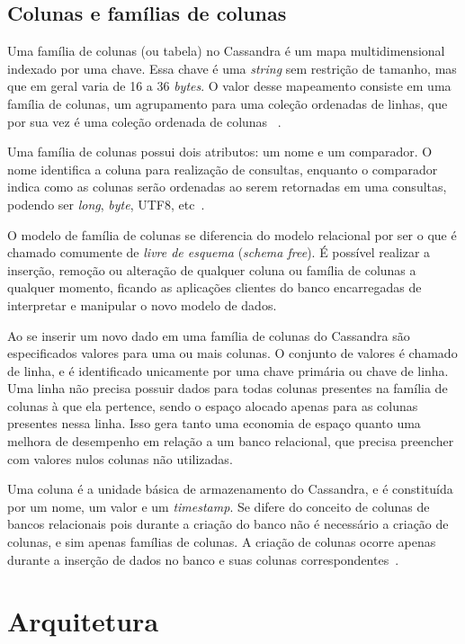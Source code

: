 \subsection*{Colunas e famílias de colunas}
Uma família de colunas (ou tabela) no Cassandra é um mapa multidimensional indexado por uma chave. Essa chave é uma \emph{string} sem restrição de tamanho, mas que em geral varia de 16 a 36 \emph{bytes}. O valor desse mapeamento consiste em uma família de colunas, um agrupamento para uma coleção ordenadas de linhas, que por sua vez é uma coleção ordenada de colunas ~\cite{lakshmancassandra, cassandraguide}.

Uma família de colunas possui dois atributos: um nome e um comparador. O nome identifica a coluna para realização de consultas, enquanto o comparador indica como as colunas serão ordenadas ao serem retornadas em uma consultas, podendo ser \emph{long}, \emph{byte}, UTF8, etc~\cite{cassandraguide}.

O modelo de família de colunas se diferencia do modelo relacional por ser o que é chamado comumente de \emph{livre de esquema} (\emph{schema free}). É possível realizar a inserção, remoção ou alteração de qualquer coluna ou família de colunas a qualquer momento, ficando as aplicações clientes do banco encarregadas de interpretar e manipular o novo modelo de dados. 

Ao se inserir um novo dado em uma família de colunas do Cassandra são especificados valores para uma ou mais colunas. O conjunto de valores é chamado de linha, e é identificado unicamente por uma chave primária ou chave de linha. Uma linha não precisa possuir dados para todas colunas presentes na família de colunas à que ela pertence, sendo o espaço alocado apenas para as colunas presentes nessa linha. Isso gera tanto uma economia de espaço quanto uma melhora de desempenho em relação a um banco relacional, que precisa preencher com valores nulos colunas não utilizadas.

Uma coluna é a unidade básica de armazenamento do Cassandra, e é constituída por um nome, um valor e um \emph{timestamp}. Se difere do conceito de colunas de bancos relacionais pois durante a criação do banco não é necessário a criação de colunas, e sim apenas famílias de colunas. A criação de colunas ocorre apenas durante a inserção de dados no banco e suas colunas correspondentes~\cite{cassandraguide}.

\section{Arquitetura}

